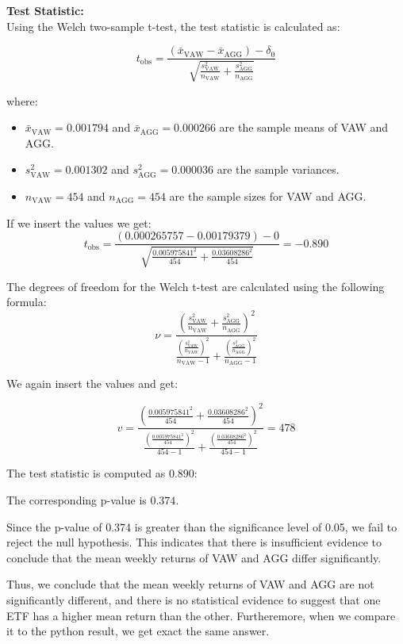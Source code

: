 \documentclass{rapport}
\begin{document}
\noindent
\textbf{Test Statistic:} \\
Using the Welch two-sample t-test, the test statistic is calculated as:

\[
t_{\text{obs}} = \frac{(\bar{x}_{\text{VAW}} - \bar{x}_{\text{AGG}}) - \delta_0}{\sqrt{\frac{s_{\text{VAW}}^2}{n_{\text{VAW}}} + \frac{s_{\text{AGG}}^2}{n_{\text{AGG}}}}}
\]

\noindent
where:
\begin{itemize}
    \item $\bar{x}_{\text{VAW}} = 0.001794$ and $\bar{x}_{\text{AGG}} = 0.000266$ are the sample means of VAW and AGG.
    \item $s_{\text{VAW}}^2 = 0.001302$ and $s_{\text{AGG}}^2 = 0.000036$ are the sample variances.
    \item $n_{\text{VAW}} = 454$ and $n_{\text{AGG}} = 454$ are the sample sizes for VAW and AGG.
\end{itemize}

\noindent
If we insert the values we get:
\[
t_{\text{obs}} = \frac{(0.000265757 - 0.00179379) - 0}{\sqrt{\frac{0.005975841^2}{454} + \frac{0.03608286^2}{454}}} = -0.890
\]

\noindent
The degrees of freedom for the Welch t-test are calculated using the following formula:
\[
\nu = \frac{\left( \frac{s_{\text{VAW}}^2}{n_{\text{VAW}}} + \frac{s_{\text{AGG}}^2}{n_{\text{AGG}}} \right)^2}{\frac{\left( \frac{s_{\text{VAW}}^2}{n_{\text{VAW}}} \right)^2}{n_{\text{VAW}} - 1} + \frac{\left( \frac{s_{\text{AGG}}^2}{n_{\text{AGG}}} \right)^2}{n_{\text{AGG}} - 1}}
\]

\noindent
We again insert the values and get:

\[
v = \frac{\left( \frac{0.005975841^2}{454} + \frac{0.03608286^2}{454} \right)^2}{\frac{\left( \frac{0.005975841^2}{454} \right)^2}{454-1} + \frac{\left( \frac{0.03608286^2}{454} \right)^2}{454-1}} = 478
\]

\noindent
The test statistic is computed as $0.890$:

\noindent
The corresponding p-value is $0.374$.

\noindent
Since the p-value of 0.374 is greater than the significance level of 0.05, we fail to reject the null hypothesis. This indicates that there is insufficient evidence to conclude that the mean weekly returns of VAW and AGG differ significantly.

\noindent
Thus, we conclude that the mean weekly returns of VAW and AGG are not significantly different, and there is no statistical evidence to suggest that one ETF has a higher mean return than the other.
Furtheremore, when we compare it to the python result, we get exact the same answer. 
\end{document}
